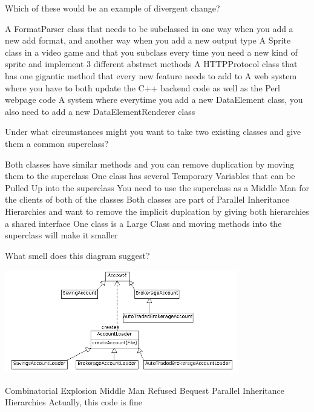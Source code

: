 \documentclass{exam}
\begin{document}
\begin{questions}
\question[1] Which of these would be an example of divergent change?

\begin{choices}
\correctchoice A FormatParser class that needs to be subclassed in one way when you add a new add format, and another way when you add a new output type
\choice A Sprite class in a video game and that you subclass every time you need a new kind of sprite and implement 3 different abstract methods
\choice A HTTPProtocol class that has one gigantic method that every new feature needs to add to
\choice A web system where you have to both update the C++ backend code as well as the Perl webpage code
\choice A system where everytime you add a new DataElement class, you also need to add a new DataElementRenderer class
\end{choices}

\question[1] Under what circumstances might you want to take two existing classes and give them a common superclass?

\begin{choices}
\correctchoice Both classes have similar methods and you can remove duplication by moving them to the superclass
\choice One class has several Temporary Variables that can be Pulled Up into the superclass
\choice You need to use the superclass as a Middle Man for the clients of both of the classes
\choice Both classes are part of Parallel Inheritance Hierarchies and want to remove the implicit duplcation by giving both hierarchies a shared interface
\choice One class is a Large Class and moving methods into the superclass will make it smaller
\end{choices}

\question[1] What smell does this diagram suggest?

\includegraphics[width=4in]{paralellH.png}

\begin{choices}
\choice Combinatorial Explosion
\choice Middle Man
\choice Refused Bequest
\correctchoice Parallel Inheritance Hierarchies
\choice Actually, this code is fine
\end{choices}


\end{questions}
\end{document}
